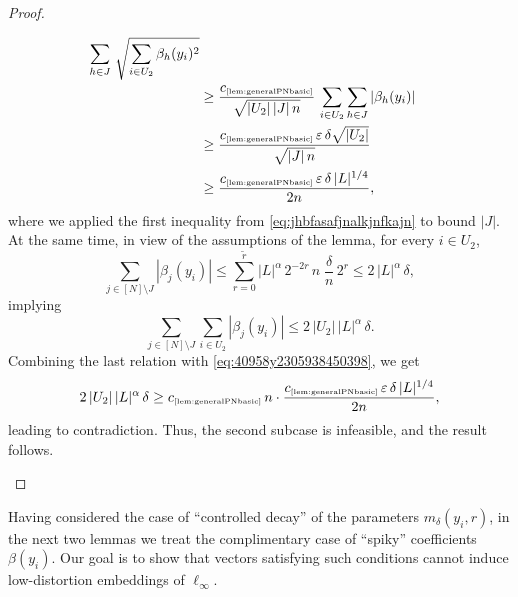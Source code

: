 \documentclass[11pt]{amsart}
\theoremstyle{definition}
\theoremstyle{plain}
\begin{document}
\begin{proof}
\begin{itemize}
\begin{align}
\sum_{h\in J}
\,\sqrt{\sum_{i\in U_2}\beta_h(y_i)^2}\nonumber\\
    &\geq 
    \frac{c_{\text{\tiny\ref{lem:generalPNbasic}}}}{\sqrt{|U_2|\,|J|\,n}}\,\sum_{i\in U_2}\sum_{h\in J}|\beta_h(y_i)|\nonumber\\
    &\geq
    \frac{c_{\text{\tiny\ref{lem:generalPNbasic}}}\,
    \varepsilon\,\delta\sqrt{|U_2|}}
    {\sqrt{|J|\,n}}\nonumber\\
    &\geq \frac{c_{\text{\tiny\ref{lem:generalPNbasic}}}\,
    \varepsilon\,\delta\,|L|^{1/4}}
    {2n},\label{eq:40958y2305938450398}
    \end{align}
    where we applied the first inequality from \eqref{eq:jhbfasafjnalkjnfkajn} to bound $|J|$.
   At the same time, in view of the assumptions
   of the lemma, for every $i\in U_2$,
   $$
   \sum_{j\in[N]\setminus J}
   |\beta_j(y_i)|
   \leq \sum\limits_{r=0}^{\tilde r}
    |L|^{\alpha}\,2^{-2r}\,n\;
    \frac{\delta}{n}\,2^{r}
    \leq 2\,|L|^{\alpha}\,\delta,
   $$
implying
$$
\sum_{j\in[N]\setminus J}
\sum_{i\in U_2}
   |\beta_j(y_i)|
\leq 2\,|U_2|\,|L|^{\alpha}\,\delta.
$$
Combining the last relation with \eqref{eq:40958y2305938450398},
we get
$$
2\,|U_2|\,|L|^{\alpha}\,\delta
\geq 
c_{\text{\tiny\ref{lem:generalPNbasic}}}\,n\cdot
\frac{c_{\text{\tiny\ref{lem:generalPNbasic}}}\,
    \varepsilon\,\delta\,|L|^{1/4}}
    {2n},
$$
leading to contradiction. Thus, the second subcase
is infeasible, and the result follows.
\end{itemize}
\end{proof}

Having considered the case of ``controlled decay'' of the parameters
$m_\delta(y_i,r)$, in the next two lemmas we treat the complimentary
case of ``spiky''
coefficients $\beta(y_i)$. Our goal is to show that vectors
satisfying such conditions cannot induce low-distortion embeddings of $\ell_\infty$.
\end{document}
